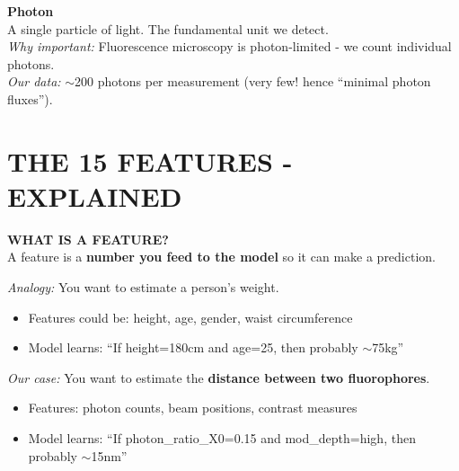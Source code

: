 \documentclass[a4paper,10pt]{article}
\begin{document}
\begin{mdframed}[style=glossar]
\textbf{Photon}\\[3pt]
A single particle of light. The fundamental unit we detect.\\
\textit{Why important:} Fluorescence microscopy is photon-limited - we count individual photons.\\
\textit{Our data:} $\sim$200 photons per measurement (very few! hence ``minimal photon fluxes'').
\end{mdframed}

\newpage

\section*{THE 15 FEATURES - EXPLAINED}

\begin{mdframed}[style=konzept]
\textbf{WHAT IS A FEATURE?}\\[5pt]
A feature is a \textbf{number you feed to the model} so it can make a prediction.

\textit{Analogy:} You want to estimate a person's weight.
\begin{itemize}[leftmargin=*, nosep]
    \item Features could be: height, age, gender, waist circumference
    \item Model learns: ``If height=180cm and age=25, then probably $\sim$75kg''
\end{itemize}

\textit{Our case:} You want to estimate the \textbf{distance between two fluorophores}.
\begin{itemize}[leftmargin=*, nosep]
    \item Features: photon counts, beam positions, contrast measures
    \item Model learns: ``If photon\_ratio\_X0=0.15 and mod\_depth=high, then probably $\sim$15nm''
\end{itemize}
\end{mdframed}

\vspace{0.3cm}
\end{document}
